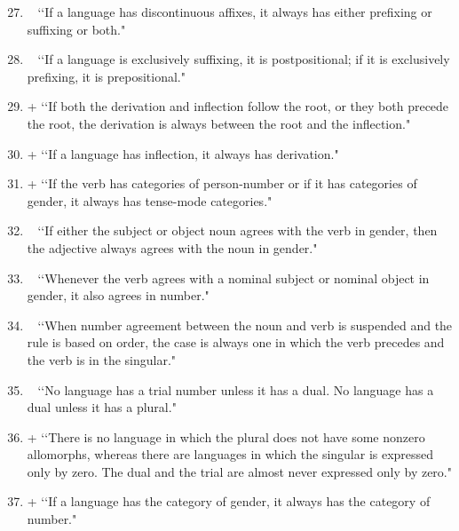 \begin{enumerate}
\setcounter{enumi}{26}
\item ~  \lq\lq If a language has discontinuous affixes, it always has either prefixing or suffixing or both." 

\item ~  \lq\lq If a language is exclusively suffixing, it is postpositional; if it is exclusively prefixing, it is prepositional." 

\item +  \lq\lq If both the derivation and inflection follow the root, or they both precede the root, the derivation is always between the root and the inflection." 

\item +  \lq\lq If a language has inflection, it always has derivation." 

\item +  \lq\lq If the verb has categories of person-number or if it has categories of gender, it always has tense-mode categories." 

\item ~  \lq\lq If either the subject or object noun agrees with the verb in gender, then the adjective always agrees with the noun in gender." 

\item ~  \lq\lq Whenever the verb agrees with a nominal subject or nominal object in gender, it also agrees in number." 

\item ~  \lq\lq When number agreement between the noun and verb is suspended and the rule is based on order, the case is always one in which the verb precedes and the verb is in the singular." 

\item ~  \lq\lq No language has a trial number unless it has a dual. No language has a dual unless it has a plural." 

\item +  \lq\lq There is no language in which the plural does not have some nonzero allomorphs, whereas there are languages in which the singular is expressed only by zero. The dual and the trial are almost never expressed only by zero." 

\item +  \lq\lq If a language has the category of gender, it always has the category of number." 


\end{enumerate}

